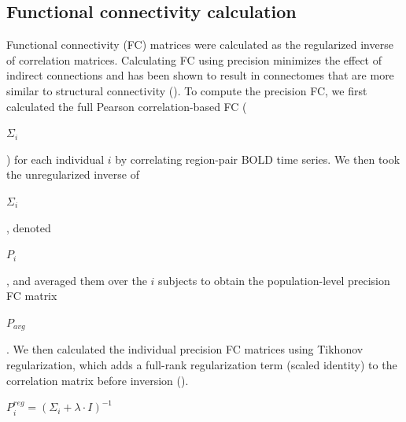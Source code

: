 \documentclass[phd,tocprelim]{cornell}
\begin{document}
	\subsection{Functional connectivity calculation}
	 Functional connectivity (FC) matrices were calculated as the regularized inverse of correlation matrices. Calculating FC using precision minimizes the effect of indirect connections and has been shown to result in connectomes that are more similar to structural connectivity (\cite{Wodeyar2020-kz, Liegeois2020-ua}). To compute the precision FC, we first calculated the full Pearson correlation-based FC ( \begin{Large}$\Sigma_i$ \end{Large}) for each individual $i$ by correlating region-pair BOLD time series. We then took the unregularized inverse of \begin{Large}$\Sigma_i$\end{Large}, denoted \begin{Large}$P_i$\end{Large}, and averaged them over the $i$ subjects to obtain the population-level precision FC matrix  \begin{Large}$P_{avg}$\end{Large}. We then calculated the individual precision FC matrices using Tikhonov regularization, which adds a full-rank regularization term (scaled identity) to the correlation matrix before inversion (\cite{Liegeois2020-ua}).
	 
\begin{Large}
\begin{center}

       $ P_i^{reg} = (\Sigma_i + \lambda \cdot I)^{-1}$

\end{center}
\end{Large}
\end{document}
